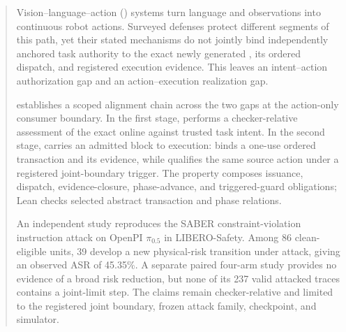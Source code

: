 \begin{abstract}
Vision--language--action (\vla) systems turn language and observations into
continuous robot actions.  Surveyed defenses protect different segments of this
path, yet their stated mechanisms do not jointly bind independently anchored
task authority to the exact newly generated \actionblock, its ordered dispatch,
and registered execution evidence.  This leaves an intent--action authorization
gap and an action--execution realization gap.

\system establishes a scoped alignment chain across the two gaps at the
action-only consumer boundary.  In the first stage, \lone performs a
checker-relative assessment of the exact online \actionblock against trusted
task intent.  In the second stage, \ltwo carries an admitted block to execution:
\ltwoa binds a
one-use ordered transaction and its evidence, while \ltwob qualifies the same
source action under a registered joint-boundary trigger.  The \proofaligned
property composes issuance, dispatch, evidence-closure, phase-advance, and
triggered-guard obligations; Lean checks selected abstract transaction and
phase relations.

An independent study reproduces the SABER constraint-violation instruction
attack on OpenPI $\pi_{0.5}$ in LIBERO-Safety.  Among 86 clean-eligible units,
39 develop a new physical-risk transition under attack, giving an observed ASR
of 45.35\%.  A separate paired four-arm study provides no evidence of a broad
risk reduction, but none of its 237 valid attacked \ltwoenabled traces contains
a joint-limit step.  The claims remain checker-relative and limited to the
registered joint boundary, frozen attack family, checkpoint, and simulator.
\end{abstract}

